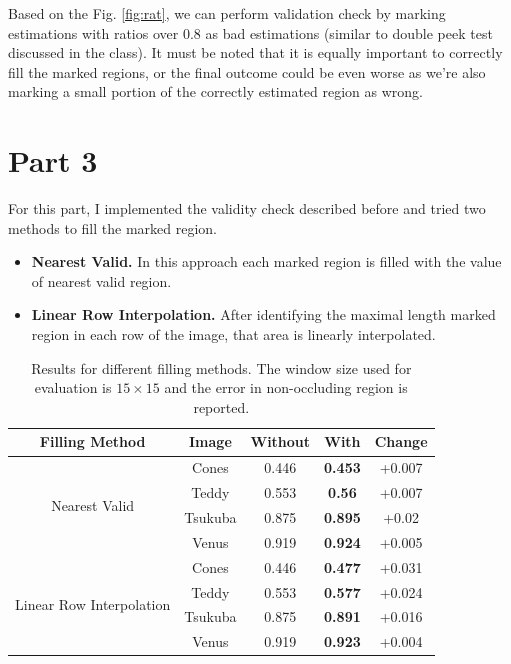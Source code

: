 \documentclass[letterpaper,12pt]{article}
\begin{document}
Based on the Fig. \ref{fig:rat}, we can perform validation check by marking estimations with ratios over $0.8$ as bad estimations (similar to double peek test discussed in the class). It must be noted that it is equally important to correctly fill the marked regions, or the final outcome could be even worse as we're also marking a small portion of the correctly estimated region as wrong.

\section{Part 3}
For this part, I implemented the validity check described before and tried two methods to fill the marked region.
\begin{itemize}
	\item \textbf{Nearest Valid.} In this approach each marked region is filled with the value of nearest valid region.
	\item \textbf{Linear Row Interpolation.} After identifying the maximal length marked region in each row of the image, that area is linearly interpolated.
\end{itemize}

\begin{table}[!h]
	\centering
	\caption{Results for different filling methods. The window size used for evaluation is $15\times15$ and the error in non-occluding region is reported.}
	\begin{tabular}{|c|c||c|c||c|}
	\hline
Filling	Method & Image & Without & With & Change \\
	\hline
	\multirow{4}{*}{Nearest Valid}	& Cones & 0.446 & \textbf{0.453} & +0.007\\
	& Teddy & 0.553 & \textbf{0.56} & +0.007\\
	& Tsukuba & 0.875 & \textbf{0.895} & +0.02\\
	& Venus & 0.919 & \textbf{0.924} & +0.005\\
	\hline 
	\multirow{4}{*}{Linear Row Interpolation}	& Cones & 0.446 & \textbf{0.477} & +0.031\\
	& Teddy & 0.553 & \textbf{0.577} & +0.024\\
	& Tsukuba & 0.875 & \textbf{0.891} & +0.016\\
	& Venus & 0.919 & \textbf{0.923} & +0.004\\
	\hline 
	\end{tabular}
\end{table}
\end{document}
